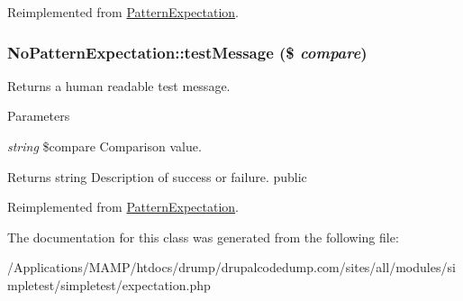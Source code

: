 Reimplemented from \hyperlink{class_pattern_expectation_a672fecfc691c4c115d4f4d37c365dae5}{PatternExpectation}.\hypertarget{class_no_pattern_expectation_a214eefe693fa189648ee4e51d38ed7b2}{
\subsubsection[{testMessage}]{\setlength{\rightskip}{0pt plus 5cm}NoPatternExpectation::testMessage (\$ {\em compare})}}
\label{class_no_pattern_expectation_a214eefe693fa189648ee4e51d38ed7b2}
Returns a human readable test message. 
\begin{DoxyParams}{Parameters}
\item[{\em string}]\$compare Comparison value. \end{DoxyParams}
\begin{DoxyReturn}{Returns}
string Description of success or failure.  public 
\end{DoxyReturn}


Reimplemented from \hyperlink{class_pattern_expectation_a7adc09e88f1abac0401d807e7f4763c8}{PatternExpectation}.

The documentation for this class was generated from the following file:\begin{DoxyCompactItemize}
\item 
/Applications/MAMP/htdocs/drump/drupalcodedump.com/sites/all/modules/simpletest/simpletest/expectation.php\end{DoxyCompactItemize}
